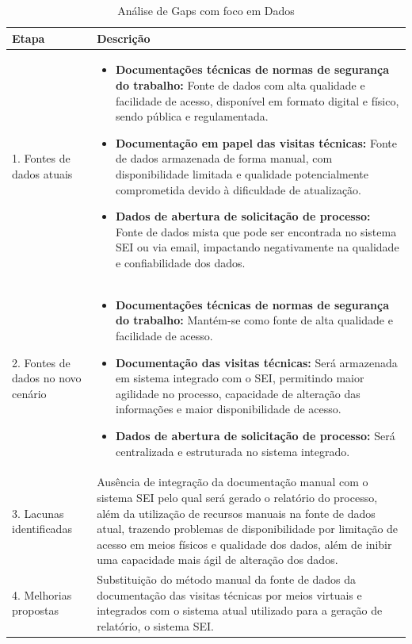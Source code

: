 \documentclass[12pt,a4paper]{article}
\begin{document}
\begin{table}[htbp]
\centering
\begin{tcolorbox}[enhanced, colback=white, colframe=gray!40, arc=3mm, boxrule=0.5pt, width=0.85\linewidth]
\begin{tabular}{|p{2cm}|p{10cm}|}
\hline
\rowcolor{gray!20}
\textbf{Etapa} & \textbf{Descrição} \\
\hline
1. Fontes de dados atuais & \begin{itemize}\setlength{\itemsep}{0pt}
\item \textbf{Documentações técnicas de normas de segurança do trabalho:} Fonte de dados com alta qualidade e facilidade de acesso, disponível em formato digital e físico, sendo pública e regulamentada.
\item \textbf{Documentação em papel das visitas técnicas:} Fonte de dados armazenada de forma manual, com disponibilidade limitada e qualidade potencialmente comprometida devido à dificuldade de atualização.
\item \textbf{Dados de abertura de solicitação de processo:} Fonte de dados mista que pode ser encontrada no sistema SEI ou via email, impactando negativamente na qualidade e confiabilidade dos dados.
\end{itemize} \\
\hline
2. Fontes de dados no novo cenário & \begin{itemize}\setlength{\itemsep}{0pt}
\item \textbf{Documentações técnicas de normas de segurança do trabalho:} Mantém-se como fonte de alta qualidade e facilidade de acesso.
\item \textbf{Documentação das visitas técnicas:} Será armazenada em sistema integrado com o SEI, permitindo maior agilidade no processo, capacidade de alteração das informações e maior disponibilidade de acesso.
\item \textbf{Dados de abertura de solicitação de processo:} Será centralizada e estruturada no sistema integrado.
\end{itemize} \\
\hline
3. Lacunas identificadas & Ausência de integração da documentação manual com o sistema SEI pelo qual será gerado o relatório do processo, além da utilização de recursos manuais na fonte de dados atual, trazendo problemas de disponibilidade por limitação de acesso em meios físicos e qualidade dos dados, além de inibir uma capacidade mais ágil de alteração dos dados. \\
\hline
4. Melhorias propostas & Substituição do método manual da fonte de dados da documentação das visitas técnicas por meios virtuais e integrados com o sistema atual utilizado para a geração de relatório, o sistema SEI. \\
\hline
\end{tabular}
\end{tcolorbox}
\caption{Análise de Gaps com foco em Dados}
\end{table}
\clearpage
\end{document}
